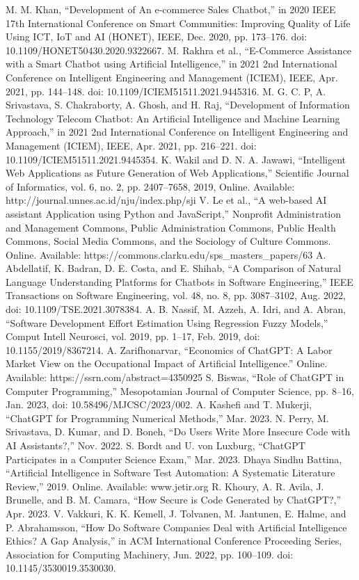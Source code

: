 \documentclass[conference]{IEEEtran}
\begin{document}
\begin{thebibliography}{00}
 M. M. Khan, “Development of An e-commerce Sales Chatbot,” in 2020 IEEE 17th International Conference on Smart Communities: Improving Quality of Life Using ICT, IoT and AI (HONET), IEEE, Dec. 2020, pp. 173–176. doi: 10.1109/HONET50430.2020.9322667. 
 M. Rakhra et al., “E-Commerce Assistance with a Smart Chatbot using Artificial Intelligence,” in 2021 2nd International Conference on Intelligent Engineering and Management (ICIEM), IEEE, Apr. 2021, pp. 144–148. doi: 10.1109/ICIEM51511.2021.9445316. 
 M. G. C. P, A. Srivastava, S. Chakraborty, A. Ghosh, and H. Raj, “Development of Information Technology Telecom Chatbot: An Artificial Intelligence and Machine Learning Approach,” in 2021 2nd International Conference on Intelligent Engineering and Management (ICIEM), IEEE, Apr. 2021, pp. 216–221. doi: 10.1109/ICIEM51511.2021.9445354. 
 K. Wakil and D. N. A. Jawawi, “Intelligent Web Applications as Future Generation of Web Applications,” Scientific Journal of Informatics, vol. 6, no. 2, pp. 2407–7658, 2019, {Online}. Available: http://journal.unnes.ac.id/nju/index.php/sji 
 V. Le et al., “A web-based AI assistant Application using Python and JavaScript,” Nonprofit Administration and Management Commons, Public Administration Commons, Public Health Commons, Social Media Commons, and the Sociology of Culture Commons. {Online}. Available: https://commons.clarku.edu/sps\_masters\_papers/63 
 A. Abdellatif, K. Badran, D. E. Costa, and E. Shihab, “A Comparison of Natural Language Understanding Platforms for Chatbots in Software Engineering,” IEEE Transactions on Software Engineering, vol. 48, no. 8, pp. 3087–3102, Aug. 2022, doi: 10.1109/TSE.2021.3078384. 
 A. B. Nassif, M. Azzeh, A. Idri, and A. Abran, “Software Development Effort Estimation Using Regression Fuzzy Models,” Comput Intell Neurosci, vol. 2019, pp. 1–17, Feb. 2019, doi: 10.1155/2019/8367214. 
 A. Zarifhonarvar, “Economics of ChatGPT: A Labor Market View on the Occupational Impact of Artificial Intelligence.” {Online}. Available: https://ssrn.com/abstract=4350925 
 S. Biswas, “Role of ChatGPT in Computer Programming,” Mesopotamian Journal of Computer Science, pp. 8–16, Jan. 2023, doi: 10.58496/MJCSC/2023/002. 
 A. Kashefi and T. Mukerji, “ChatGPT for Programming Numerical Methods,” Mar. 2023. 
 N. Perry, M. Srivastava, D. Kumar, and D. Boneh, “Do Users Write More Insecure Code with AI Assistants?,” Nov. 2022. 
 S. Bordt and U. von Luxburg, “ChatGPT Participates in a Computer Science Exam,” Mar. 2023. 
 Dhaya Sindhu Battina, “Artificial Intelligence in Software Test Automation: A Systematic Literature Review,” 2019. {Online}. Available: www.jetir.org 
 R. Khoury, A. R. Avila, J. Brunelle, and B. M. Camara, “How Secure is Code Generated by ChatGPT?,” Apr. 2023. 
 V. Vakkuri, K. K. Kemell, J. Tolvanen, M. Jantunen, E. Halme, and P. Abrahamsson, “How Do Software Companies Deal with Artificial Intelligence Ethics? A Gap Analysis,” in ACM International Conference Proceeding Series, Association for Computing Machinery, Jun. 2022, pp. 100–109. doi: 10.1145/3530019.3530030.
\end{thebibliography}
\end{document}

